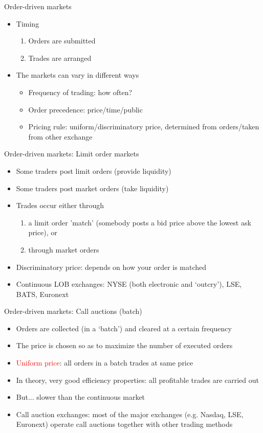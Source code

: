 \documentclass[english,10pt]{beamer}
\theoremstyle{definition}
\begin{document}
\begin{frame}{Order-driven markets}
\begin{itemize}
	\item Timing
	\begin{enumerate}
		\item Orders are submitted
		\item Trades are arranged
	\end{enumerate}
	\item The markets can vary in different ways
	\begin{itemize}
		\item Frequency of trading: how often?
		\item Order precedence: price/time/public
		\item Pricing rule: uniform/discriminatory price, determined from orders/taken from other exchange
	\end{itemize}
\end{itemize}
\end{frame}


\begin{frame}{Order-driven markets: Limit order markets}
\begin{itemize}
	\item Some traders post limit orders (provide liquidity)
	\item Some traders post market orders (take liquidity)
	\item Trades occur either through 
	\begin{enumerate}
		\item a limit order 'match' (somebody posts a bid price above the lowest ask price), or
		\item through market orders
	\end{enumerate}
	\item \alert{Discriminatory price}: depends on how your order is matched
	\item Continuous LOB exchanges: NYSE (both electronic and `outcry'), LSE, BATS, Euronext
\end{itemize}
\end{frame}


\begin{frame}{Order-driven markets: Call auctions (batch)}
\begin{itemize}
	\item Orders are collected (in a `batch') and cleared at a certain frequency
	\item The price is chosen so as to maximize the number of executed orders
	\item \textcolor{red}{Uniform price}: all orders in a batch trades at same price
	\item In theory,  very good efficiency properties: all profitable trades are carried out
	\item But... slower than the continuous market
	\item Call auction exchanges: most of the major exchanges (e.g. Nasdaq, LSE, Euronext) operate call auctions together with other trading methods
\end{itemize}
\end{frame}
\end{document}
